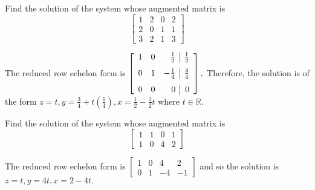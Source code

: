 \documentclass{ximera}
\begin{document}
\begin{problem}\label{prb:2.26} Find the solution of the system whose augmented matrix is
\begin{equation*}
\left[
\begin{array}{rrr|r}
1 & 2 & 0 & 2 \\
2 & 0 & 1 & 1 \\
3 & 2 & 1 & 3
\end{array}
\right]
\end{equation*}
\begin{hint}
The reduced row echelon form is $\left[
\begin{array}{rrr|r}
1 & 0 & \vspace{0.05in}\frac{1}{2} & \vspace{0.05in}\frac{1}{2} \\
0 & 1 & -\vspace{0.05in}\frac{1}{4} & \vspace{0.05in}\frac{3}{4} \\
0 & 0 & 0 & 0
\end{array}
\right] .$ Therefore, the solution is of the form $z=t,y=\frac{3}{4}+t\left(
\frac{1}{4}\right) ,x=\frac{1}{2}-\frac{1}{2}t$ where $t\in \mathbb{R}$.
\end{hint}
\end{problem}

\begin{problem}\label{prb:2.27} Find the solution of the system whose augmented matrix is
\begin{equation*}
\left[
\begin{array}{rrr|r}
1 & 1 & 0 & 1 \\
1 & 0 & 4 & 2
\end{array}
\right]
\end{equation*}
\begin{hint}
The reduced row echelon form is $\left[
\begin{array}{rrr|r}
1 & 0 & 4 & 2 \\
0 & 1 & -4 & -1
\end{array}
\right] $ and so the solution is $z=t,y=4t,x=2-4t.$
\end{hint}
\end{problem}
\end{document}
